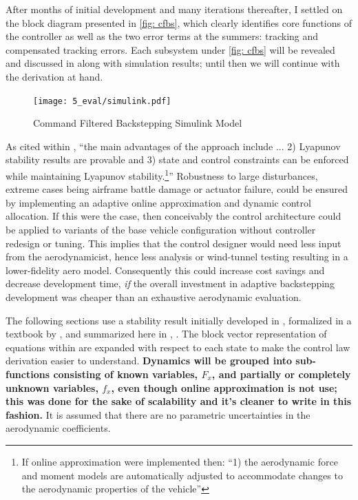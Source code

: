 \documentclass[12pt]{ucthesis}
\begin{document}
After months of initial development and many iterations thereafter, I settled on the block diagram presented in \autoref{fig: cfbs}, which clearly identifies core functions of the controller as well as the two error terms at the summers: tracking and compensated tracking errors. Each subsystem under \autoref{fig: cfbs} will be revealed and discussed in  along with simulation results; until then we will continue with the derivation at hand.
%
\begin{figure} %
	\centering
	\texttt{[image: 5\_eval/simulink.pdf]}%
	\caption{Command Filtered Backstepping Simulink Model}
	\label{fig: cfbs}
\end{figure}

As cited within \citet{Farrell2005}, ``the main advantages of the approach include ... 2) Lyapunov stability results are provable and 3) state and control constraints can be enforced while maintaining Lyapunov stability.\footnote{If online approximation were implemented then: ``1) the aerodynamic force and moment models are automatically adjusted to accommodate changes to the aerodynamic properties of the vehicle''}'' Robustness to large disturbances, extreme cases being airframe battle damage or actuator failure, could be ensured by implementing an adaptive online approximation and dynamic control allocation. If this were the case, then conceivably the control architecture could be applied to variants of the base vehicle configuration without controller redesign or tuning. This implies that the control designer would need less input from the aerodynamicist, hence less analysis or wind-tunnel testing resulting in a lower-fidelity aero model. Consequently this could increase cost savings and decrease development time, \textit{if} the overall investment in adaptive backstepping development was cheaper than an exhaustive aerodynamic evaluation.

The following sections use a stability result initially developed in \citet{Farrell2004}, formalized in a textbook by \citet[Sec. 5.3.3]{Farrell2006}, and summarized here in , . The block vector representation of equations within \citet{Farrell2005} are expanded with respect to each state to make the control law derivation easier to understand. \textbf{Dynamics will be grouped into sub-functions consisting of known variables, $F_x$, and partially or completely unknown variables, $f_x$, even though online approximation is not use; this was done for the sake of scalability and it's cleaner to write in this fashion.} It is assumed that there are no parametric uncertainties in the aerodynamic coefficients.
\end{document}
